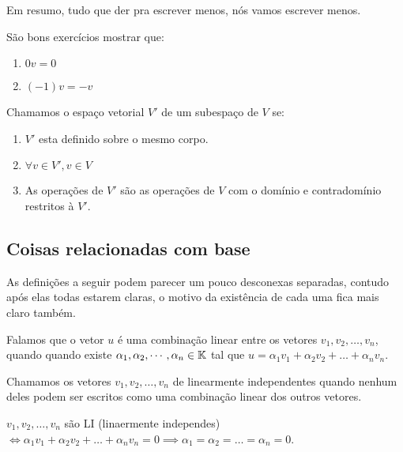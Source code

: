 Em resumo, tudo que der pra escrever menos, nós vamos escrever menos.

São bons exercícios mostrar que:

\begin{enumerate}
    \item $0v=0$
    \item $(-1)v = -v$
\end{enumerate}

\begin{defn}

Chamamos o espaço vetorial $V'$ de um subespaço de $V$ se: 
\begin{enumerate}
    \item $V'$ esta definido sobre o mesmo corpo.
    \item $\forall v \in V', v \in V$
    \item As operações de $V'$ são as operações de $V$ com o domínio e contradomínio restritos à $V'$. 
    
%    
%    
\end{enumerate}
\end{defn}

\subsection{Coisas relacionadas com base}

As  definições a seguir podem parecer um pouco desconexas separadas, contudo após elas todas estarem claras, o motivo da existência de cada uma fica mais claro também.


\begin{defn}
Falamos que o vetor $u$  é uma combinação linear entre os vetores $v_1,v_2,\dots,v_n$, quando quando existe $\alpha_1, \alpha_2, \cdots , \alpha_n \in \mathbb{K}$ tal que $u = \alpha_1v_1 + \alpha_2v_2 +\dots + \alpha_nv_n $.
\end{defn}

\begin{defn}
Chamamos os vetores $v_1,v_2, \dots, v_n$ de linearmente independentes quando nenhum deles podem ser escritos como uma combinação linear dos outros vetores.
\end{defn}

\begin{cor}
$v_1,v_2, \dots, v_n$ são LI (linaermente independes) $\iff \alpha_1v_1 + \alpha_2v_2 +\dots + \alpha_nv_n = 0 \implies \alpha_1 = \alpha_2 = \dots = \alpha_n =0$.
\end{cor}

